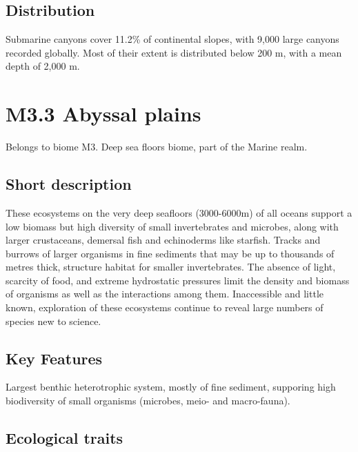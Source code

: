 \documentclass[
  letterpaper,
  DIV=11,
  numbers=noendperiod]{scrartcl}
\begin{document}
\subsection{Distribution}\label{distribution-41}

Submarine canyons cover 11.2\% of continental slopes, with 9,000 large
canyons recorded globally. Most of their extent is distributed below 200
m, with a mean depth of 2,000 m.

\section{M3.3 Abyssal plains}\label{m3.3-abyssal-plains}

Belongs to biome M3. Deep sea floors biome, part of the Marine realm.

\subsection{Short description}\label{short-description-42}

These ecosystems on the very deep seafloors (3000-6000m) of all oceans
support a low biomass but high diversity of small invertebrates and
microbes, along with larger crustaceans, demersal fish and echinoderms
like starfish. Tracks and burrows of larger organisms in fine sediments
that may be up to thousands of metres thick, structure habitat for
smaller invertebrates. The absence of light, scarcity of food, and
extreme hydrostatic pressures limit the density and biomass of organisms
as well as the interactions among them. Inaccessible and little known,
exploration of these ecosystems continue to reveal large numbers of
species new to science.

\subsection{Key Features}\label{key-features-42}

Largest benthic heterotrophic system, mostly of fine sediment, supporing
high biodiversity of small organisms (microbes, meio- and macro-fauna).

\subsection{Ecological traits}\label{ecological-traits-42}
\end{document}

